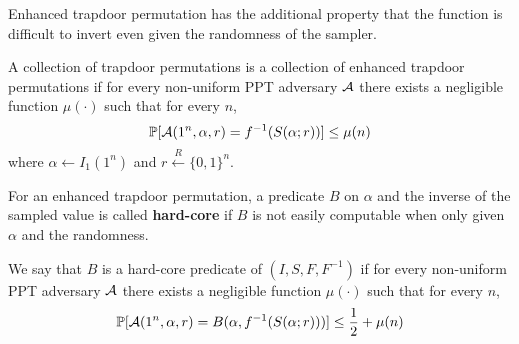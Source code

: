 Enhanced trapdoor permutation has the additional property that the function is difficult to invert even given the randomness of the sampler.
\begin{definition} A collection of {\sf trapdoor permutations} is a collection of {\sf enhanced trapdoor permutations} if for every non-uniform PPT adversary $\mathcal{A}$ there exists a negligible function $\mu(\cdot)$ such that for every $n$,
$$\mathop{\mathbb P\/}[\mathcal{A}(1^n,\alpha,r)=f^{-1}(S(\alpha;r))]\leq\mu(n)$$
where $\alpha\leftarrow I_1(1^n)$ and $r\stackrel{R}{\leftarrow}\{0,1\}^n$.
\end{definition}
For an enhanced trapdoor permutation, a predicate $B$ on $\alpha$ and the inverse of the sampled value is called \textbf{hard-core} if $B$ is not easily computable when only given $\alpha$ and the randomness.
\begin{definition} We say that $B$ is a {\sf hard-core predicate} of $(I,S,F,F^{-1})$ if for every non-uniform PPT adversary $\mathcal{A}$ there exists a negligible function $\mu(\cdot)$ such that for every $n$,
$$\mathop{\mathbb P\/}[\mathcal{A}(1^n,\alpha,r)=B(\alpha, f^{-1}(S(\alpha;r)))]\leq\frac{1}{2}+\mu(n)$$
\end{definition}
